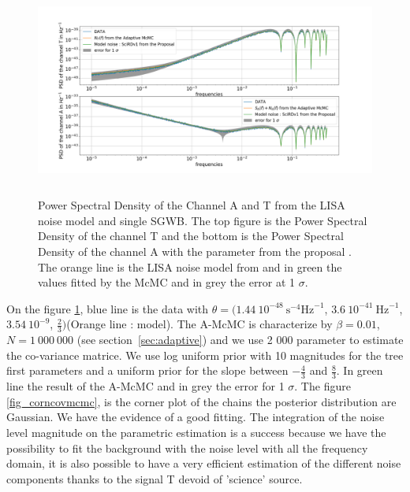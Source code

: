 \documentclass[a4paper,12pt]{article}
\begin{document}
\begin{figure}[H]
    \centering
    \includegraphics[height= 7cm]{covarince/Data+McMC.png}
    \caption{Power Spectral Density of the Channel A and T  from the LISA noise model \cite{PhysRevD.100.104055} and single SGWB. The top figure is the Power Spectral Density of the channel T and the bottom is the Power Spectral Density of the channel A with the parameter from the proposal \cite{LSR}. The orange line is the LISA noise model from \cite{PhysRevD.100.104055}  and in green the values fitted by the McMC and in grey the error at 1 $\sigma$. }
    \label{fig_covmcmc}
\end{figure}

On the figure \ref{fig_covmcmc}, blue line is the data with $\theta = \bigg(1.44 \ 10^{-48} \ \text{s}^{-4}\text{Hz}^{-1}$, $3.6 \ 10^{-41} \ \text{Hz}^{-1}$, $3.54 \ 10^{-9}$, $\frac{2}{3}\bigg)$(Orange line : model). The A-McMC is characterize by $\beta = 0.01$, $N = 1 \ 000 \ 000$ (see section~\ref{sec:adaptive}) and we use 2 000 parameter to estimate the co-variance matrice. We use log uniform prior with 10 magnitudes for the tree first parameters and a uniform prior for the slope between $-\frac{4}{3}$ and $\frac{8}{3}$. In green line the result of the A-McMC and in grey the error for 1 $\sigma$. The figure \ref{fig_corncovmcmc}, is the corner plot of the chains the posterior distribution are Gaussian. We have the evidence of a good fitting. The integration of the noise level magnitude on the parametric estimation is a success because we have the possibility to fit the background with the noise level with all the frequency domain, it is also possible to have a very efficient estimation of the different noise components thanks to the signal T devoid of 'science' source.
\end{document}
